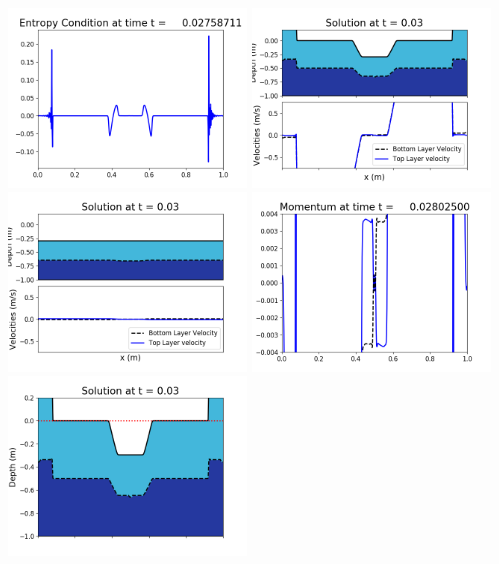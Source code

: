 \documentclass[11pt]{article}
\begin{document}
\vskip 10pt 
\includegraphics[width=0.475\textwidth]{frame0064fig1009.png}
\vskip 10pt 
\includegraphics[width=0.475\textwidth]{frame0065fig1001.png}
\includegraphics[width=0.475\textwidth]{frame0065fig1002.png}
\vskip 10pt 
\includegraphics[width=0.475\textwidth]{frame0065fig1003.png}
\includegraphics[width=0.475\textwidth]{frame0065fig1006.png}
\end{document}
